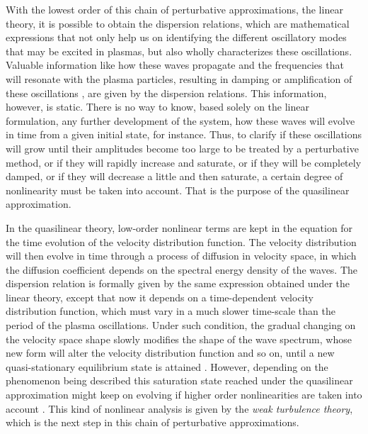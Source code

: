 \documentclass[12pt,a4paper,ruledheader]{report}
\begin{document}
With the lowest order of this chain of perturbative approximations, the
linear theory, it is possible to obtain the dispersion relations, which
are mathematical expressions that not only help us on identifying the
different oscillatory modes that may be excited in plasmas, but also
wholly characterizes these oscillations. Valuable information like
how these waves propagate and the frequencies that will resonate with
the plasma particles, resulting in damping or amplification of these
oscillations \cite{bitt,chen,gurnett2017}, are given by the dispersion
relations. This information, however, is static. There is no way to
know, based solely on the linear formulation, any further development
of the system, how these waves will evolve in time from a given initial
state, for instance. Thus, to clarify if these oscillations will grow
until their amplitudes become too large to be treated by a perturbative
method, or if they will rapidly increase and saturate, or if they will
be completely damped, or if they will decrease a little and then saturate, 
a certain degree of nonlinearity must be taken into account. That is the
purpose of the quasilinear approximation.

In the quasilinear theory, low-order nonlinear terms are kept in
the equation for the time evolution of the velocity distribution
function. The velocity distribution will then evolve in time through
a process of diffusion in velocity space, in which the diffusion
coefficient depends on the spectral energy density of the waves.
The dispersion relation is formally given by the same expression
obtained under the linear theory, except that now it depends on a
time-dependent velocity distribution function, which must vary in a
much slower time-scale than the period of the plasma oscillations.
Under such condition, the gradual changing on the velocity space
shape slowly modifies the shape of the wave spectrum, whose
new form will alter the velocity distribution function and so
on, until a new quasi-stationary equilibrium state is attained
\cite{gurnett2017}. However, depending on the phenomenon being
described this saturation state reached under the quasilinear
approximation might keep on evolving if higher order nonlinearities are taken into account
\cite{akhi2}. This kind of nonlinear analysis is given by the
\emph{weak turbulence theory}, which is the next step in this chain
of perturbative approximations.
\end{document}
